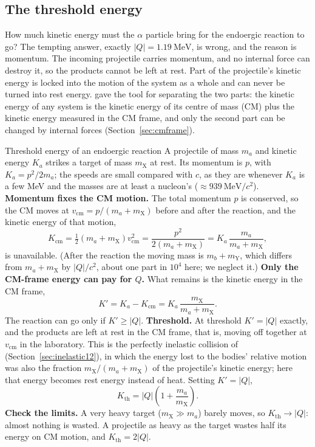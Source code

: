 \subsection{The threshold energy}

How much kinetic energy must the $\alpha$ particle bring for the endoergic reaction to go? The tempting
answer, exactly $|Q|=\SI{1.19}{\MeV}$, is wrong, and the reason is momentum. The incoming projectile
carries momentum, and no internal force can destroy it, so the products cannot be left at rest. Part of
the projectile's kinetic energy is locked into the motion of the system as a whole and can never be
turned into rest energy.  gave the tool for separating the two parts: the kinetic energy
of any system is the kinetic energy of its centre of mass (CM) plus the kinetic energy measured in the
CM frame, and only the second part can be changed by internal forces (Section~\ref{sec:cmframe}).

\begin{derivbox}{Threshold energy of an endoergic reaction}
A projectile of mass $m_a$ and kinetic energy $K_a$ strikes a target of mass $m_{\mathrm X}$ at rest.
Its momentum is $p$, with $K_a=p^2/2m_a$; the speeds are small compared with $c$, as they are whenever
$K_a$ is a few MeV and the masses are at least a nucleon's ($\approx\SI{939}{\MeV}/c^2$).
 \textbf{Momentum fixes the CM motion.} The total momentum $p$ is conserved, so the CM moves
at $v_{\text{cm}}=p/(m_a+m_{\mathrm X})$ before and after the reaction, and the kinetic energy of that
motion,
\[
K_{\text{cm}}=\tfrac12(m_a+m_{\mathrm X})v_{\text{cm}}^2=\frac{p^2}{2(m_a+m_{\mathrm X})}
=K_a\,\frac{m_a}{m_a+m_{\mathrm X}},
\]
is unavailable. (After the reaction the moving mass is $m_b+m_{\mathrm Y}$, which differs from
$m_a+m_{\mathrm X}$ by $|Q|/c^2$, about one part in $10^4$ here; we neglect it.)
 \textbf{Only the CM-frame energy can pay for $Q$.} What remains is the kinetic energy in the
CM frame,
\[
K'=K_a-K_{\text{cm}}=K_a\,\frac{m_{\mathrm X}}{m_a+m_{\mathrm X}} .
\]
The reaction can go only if $K'\ge|Q|$.
 \textbf{Threshold.} At threshold $K'=|Q|$ exactly, and the products are left at rest in the CM
frame, that is, moving off together at $v_{\text{cm}}$ in the laboratory. This is the perfectly
inelastic collision of  (Section~\ref{sec:inelastic12}), in which the energy lost to the bodies' relative
motion was also the fraction $m_{\mathrm X}/(m_a+m_{\mathrm X})$ of the projectile's kinetic energy; here
that energy becomes rest energy instead of heat. Setting $K'=|Q|$,
\begin{equation}\label{eq:react-threshold}
\boxed{K_{\text{th}}=|Q|\left(1+\frac{m_a}{m_{\mathrm X}}\right).}
\end{equation}
 \textbf{Check the limits.} A very heavy target ($m_{\mathrm X}\gg m_a$) barely moves, so
$K_{\text{th}}\to|Q|$: almost nothing is wasted. A projectile as heavy as the target wastes half its
energy on CM motion, and $K_{\text{th}}=2|Q|$.
\end{derivbox}

